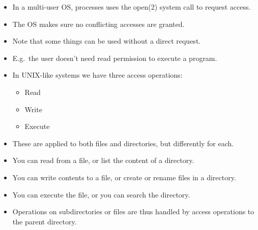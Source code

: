 \documentclass{beamer}
\begin{document}

\begin{frame}
  \begin{example}
    \begin{itemize}
      \item In a multi-user OS, processes uses the open(2) system call to request 
        access.

      \item The OS makes sure no conflicting accesses are granted.

      \item Note that some things can be used without a direct request.

      \item E.g.\ the user doesn't need read permission to execute a program.

    \end{itemize}
  \end{example}
\end{frame}

\begin{frame}
  \begin{example}
    \begin{itemize}
      \item In UNIX-like systems we have three access operations:
        \begin{itemize}
          \item Read
          \item Write
          \item Execute
        \end{itemize}

      \item These are applied to both files and directories, but differently for 
        each.

      \item You can read from a file, or list the content of a directory.

      \item You can write contents to a file, or create or rename files in 
        a directory.

      \item You can execute the file, or you can search the directory.

      \item Operations on subdirectories or files are thus handled by access 
        operations to the parent directory.

    \end{itemize}
  \end{example}
\end{frame}
\end{document}
